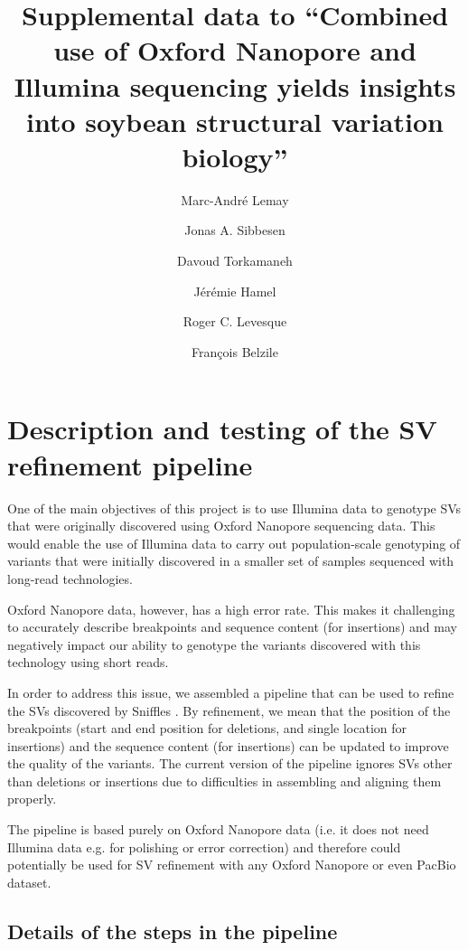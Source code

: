 \documentclass[12pt]{article}
\title{Supplemental data to ``Combined use of Oxford Nanopore and Illumina sequencing yields insights into soybean structural variation biology''}
\author{Marc-André Lemay \and Jonas A. Sibbesen \and Davoud Torkamaneh \and Jérémie Hamel \and Roger C. Levesque \and François Belzile}
\date{}
\begin{document}
\maketitle \thispagestyle{empty}

\tableofcontents

\vspace{4ex}

\listoftables

\thispagestyle{empty}

\vspace{4ex}

\listoffigures


\clearpage

\section{Description and testing of the SV refinement pipeline}

One of the main objectives of this project is to use Illumina data to genotype SVs that were originally discovered using Oxford Nanopore sequencing data. 
This would enable the use of Illumina data to carry out population-scale genotyping of variants that were initially discovered in a smaller set of samples sequenced with long-read technologies.

Oxford Nanopore data, however, has a high error rate.
This makes it challenging to accurately describe breakpoints and sequence content (for insertions) and may negatively impact our ability to genotype the variants discovered with this technology using short reads.

In order to address this issue, we assembled a pipeline that can be used to refine the SVs discovered by Sniffles \citep{ngmlr}.
By refinement, we mean that the position of the breakpoints (start and end position for deletions, and single location for insertions) and the sequence content (for insertions) can be updated to improve the quality of the variants. 
The current version of the pipeline ignores SVs other than deletions or insertions due to difficulties in assembling and aligning them properly.

The pipeline is based purely on Oxford Nanopore data (i.e. it does not need Illumina data e.g. for polishing or error correction) and therefore could potentially be used for SV refinement with any Oxford Nanopore or even PacBio dataset.

\subsection{Details of the steps in the pipeline}
\end{document}
